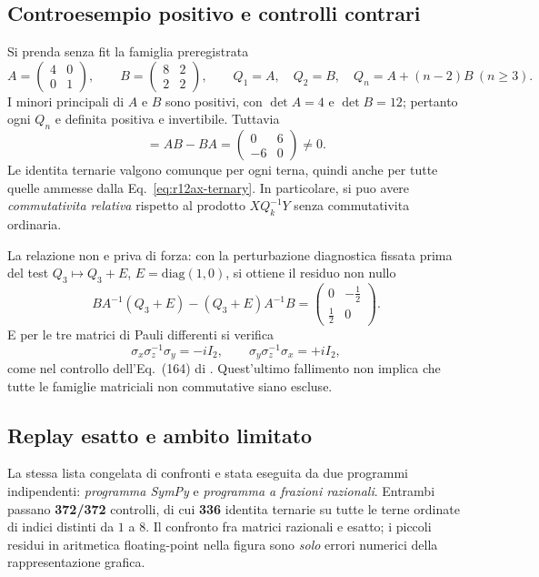 \documentclass[11pt,a4paper]{article}
\begin{document}
\subsection{Controesempio positivo e controlli contrari}
Si prenda senza fit la famiglia preregistrata
\begin{equation}
 A=\begin{pmatrix}4&0\\0&1\end{pmatrix},\qquad
 B=\begin{pmatrix}8&2\\2&2\end{pmatrix},\qquad
 Q_1=A,\quad Q_2=B,\quad Q_n=A+(n-2)B\ (n\ge3).
 \label{eq:r12ax-example}
\end{equation}
I minori principali di $A$ e $B$ sono positivi, con $\det A=4$ e $\det B=12$; pertanto ogni $Q_n$ e definita positiva e invertibile. Tuttavia
\begin{equation}
 [A,B]=AB-BA=\begin{pmatrix}0&6\\-6&0\end{pmatrix}\ne0.
 \label{eq:r12ax-noncomm}
\end{equation}
Le identita ternarie valgono comunque per ogni terna, quindi anche per tutte quelle ammesse dalla Eq.~\eqref{eq:r12ax-ternary}. In particolare, si puo avere \emph{commutativita relativa} rispetto al prodotto $XQ_k^{-1}Y$ senza commutativita ordinaria.

La relazione non e priva di forza: con la perturbazione diagnostica fissata prima del test $Q_3\mapsto Q_3+E$, $E=\mathrm{diag}(1,0)$, si ottiene il residuo non nullo
\begin{equation}
 B A^{-1}(Q_3+E)-(Q_3+E)A^{-1}B
 =\begin{pmatrix}0&-\frac12\\\frac12&0\end{pmatrix}.
 \label{eq:r12ax-perturb}
\end{equation}
E per le tre matrici di Pauli differenti si verifica
\begin{equation}
 \sigma_x\sigma_z^{-1}\sigma_y=-iI_2,\qquad
 \sigma_y\sigma_z^{-1}\sigma_x=+iI_2,
\end{equation}
come nel controllo dell'Eq.~(164) di \cite{SrivastavaSurya2026}. Quest'ultimo fallimento non implica che tutte le famiglie matriciali non commutative siano escluse.

\subsection{Replay esatto e ambito limitato}
La stessa lista congelata di confronti e stata eseguita da due programmi indipendenti: \emph{programma SymPy} e \emph{programma a frazioni razionali}. Entrambi passano \textbf{372/372} controlli, di cui \textbf{336} identita ternarie su tutte le terne ordinate di indici distinti da $1$ a $8$. Il confronto fra matrici razionali e esatto; i piccoli residui in aritmetica floating-point nella figura sono \emph{solo} errori numerici della rappresentazione grafica.
\end{document}
